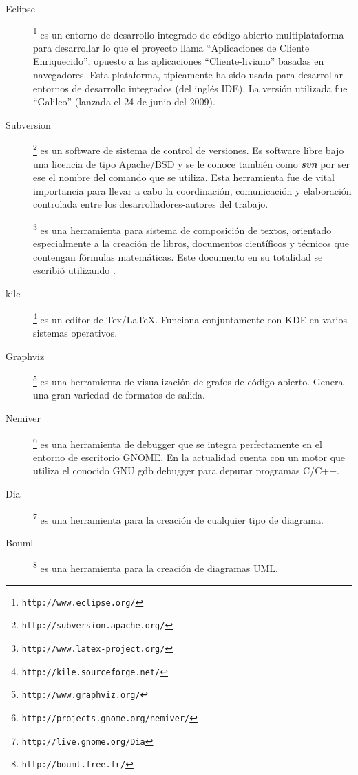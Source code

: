 \begin{description}
\item [Eclipse]\footnote{\texttt{http://www.eclipse.org/}} es un entorno de desarrollo integrado de código abierto multiplataforma para desarrollar lo que el proyecto llama ``Aplicaciones de Cliente Enriquecido'', opuesto a las aplicaciones ``Cliente-liviano'' basadas en navegadores. Esta plataforma, típicamente ha sido usada para desarrollar entornos de desarrollo integrados (del inglés IDE). La versión utilizada fue ``Galileo'' (lanzada el 24 de junio del 2009).

\item [Subversion]\footnote{\texttt{http://subversion.apache.org/}} es un software de sistema de control de versiones. Es software libre bajo una licencia de tipo Apache/BSD y se le conoce también como \textit{\textbf{svn}} por ser ese el nombre del comando que se utiliza. Esta herramienta fue de vital importancia para llevar a cabo la coordinación, comunicación y elaboración controlada entre los desarrolladores-autores del trabajo.

\item [\LaTeXe]\footnote{\texttt{http://www.latex-project.org/}} es una herramienta para sistema de composición de textos, orientado especialmente a la creación de libros, documentos científicos y técnicos que contengan fórmulas matemáticas. Este documento en su totalidad se escribió utilizando \LaTeXe.

\item [kile]\footnote{\texttt{http://kile.sourceforge.net/}} es un editor de Tex/LaTeX. Funciona conjuntamente con KDE en varios sistemas operativos.

\item [Graphviz]\footnote{\texttt{http://www.graphviz.org/}} es una herramienta de visualización de grafos de código abierto. Genera una gran variedad de formatos de salida.

\item [Nemiver]\footnote{\texttt{http://projects.gnome.org/nemiver/}} es una herramienta de debugger que se integra perfectamente en el entorno de escritorio GNOME. En la actualidad cuenta con un motor que utiliza el conocido GNU gdb debugger para depurar programas C/C++.

\item [Dia]\footnote{\texttt{http://live.gnome.org/Dia}} es una herramienta para la creación de cualquier tipo de diagrama.

\item[Bouml]\footnote{\texttt{http://bouml.free.fr/}} es una herramienta para la creación de diagramas UML.


\end{description}
